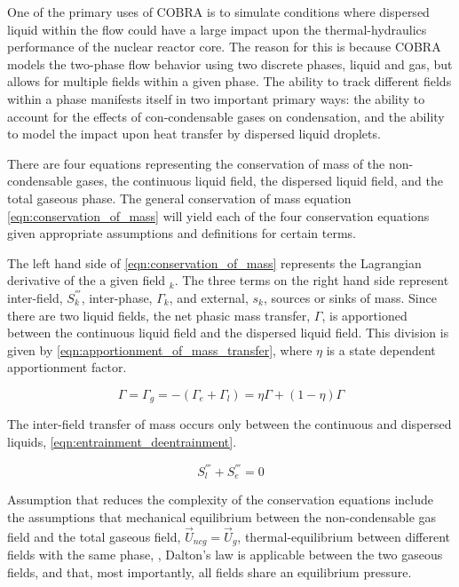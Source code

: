 One of the primary uses of COBRA is to simulate conditions where dispersed liquid within the flow could have a large impact upon the thermal-hydraulics performance of the nuclear reactor core.
The reason for this is because COBRA models the two-phase flow behavior using two discrete phases, liquid and gas, but allows for multiple fields within a given phase.
The ability to track different fields within a phase manifests itself in two important primary ways: the ability to account for the effects of con-condensable gases on condensation, and the ability to model the impact upon heat transfer by dispersed liquid droplets.

There are four equations representing the conservation of mass of the non-condensable gases, the continuous liquid field, the dispersed liquid field, and the total gaseous phase.
The general conservation of mass equation \eqref{eqn:conservation_of_mass} will yield each of the four conservation equations given appropriate assumptions and definitions for certain terms.

The left hand side of \eqref{eqn:conservation_of_mass} represents the Lagrangian derivative of the a given field $_k$.
The three terms on the right hand side represent inter-field, $S^{'''}_k$, inter-phase, $\Gamma_k$,  and external, $s_k$, sources or sinks of mass.
Since there are two liquid fields, the net phasic mass transfer, $\Gamma$, is apportioned between the continuous liquid field and the dispersed liquid field.
This division is given by \eqref{eqn:apportionment_of_mass_transfer}, where $\eta$ is a state dependent apportionment factor.

\begin{equation}
\label{eqn:apportionment_of_mass_transfer}
\Gamma = \Gamma_g = -( \Gamma_e + \Gamma_l ) =  \eta \Gamma + (1 - \eta)\Gamma
\end{equation}

The inter-field transfer of mass occurs only between the continuous and dispersed liquids, \eqref{eqn:entrainment_deentrainment}.

\begin{equation}
\label{eqn:entrainment_deentrainment}
S^{'''}_l + S^{'''}_e = 0
\end{equation}

Assumption that reduces the complexity of the conservation equations include the assumptions that mechanical equilibrium between the non-condensable gas field and the total gaseous field, $\vec{U}_{ncg} = \vec{U}_g$, thermal-equilibrium between different fields with the same phase, $ $, Dalton's law is applicable between the two gaseous fields, and that, most importantly, all fields share an equilibrium pressure.

